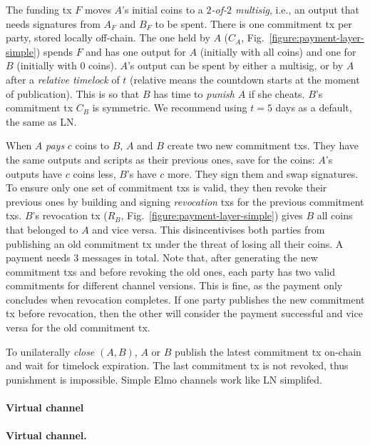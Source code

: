   The funding tx $F$ moves $A$'s initial coins to a \emph{$2$-of-$2$ multisig}, i.e., an
  output that needs signatures from $A_F$ and $B_F$ to be spent. There is one
  commitment tx per party, stored locally off-chain. The one held by $A$
  ($C_A$, Fig.~\ref{figure:payment-layer-simple}) spends $F$
  and has one output for $A$ (initially with all coins) and one for $B$
  (initially with $0$ coins). $A$'s output can be spent by either a multisig, or
  by $A$ after a \emph{relative timelock} of $t$ (relative means the countdown starts at the moment of
  publication). This is so
  that $B$ has time to \emph{punish} $A$ if she cheats. $B$'s commitment tx
  $C_B$ is symmetric. We recommend using $t = 5$ days as a default, the same as
  LN.

  When $A$ \emph{pays} $c$ coins to $B$, $A$ and $B$ create two new
  commitment txs.
  They have the same outputs and scripts as their previous ones, save for the
  coins: $A$'s outputs have $c$ coins less, $B$'s have $c$ more.
  They sign them and swap signatures. To ensure only one set of
  commitment txs is valid, they then revoke their previous ones by
  building and signing \emph{revocation} txs for the previous
  commitment txs. $B$'s revocation tx ($R_B$,
  Fig.~\ref{figure:payment-layer-simple}) gives $B$ all coins that belonged
  to $A$ and vice versa. This disincentivises both parties
  from publishing an old commitment tx under the threat of
  losing all their coins. A payment needs $3$ messages in total. Note
  that, after generating the new commitment txs and before revoking the old
  ones, each party has two valid commitments for different channel versions.
  This is fine, as the payment only concludes when revocation completes. If one
  party publishes the new commitment tx before revocation, then the
  other will consider the payment successful and vice versa for the old
  commitment tx.

  To unilaterally \emph{close} $(A, B)$, $A$ or $B$ publish the latest
  commitment tx on-chain and wait for timelock expiration. The last
  commitment tx is not revoked, thus punishment is impossible. Simple Elmo
  channels work like LN simplifed.

  \makeatletter%
    {\paragraph{Virtual channel}}%
    {\paragraph{Virtual channel.}}%
  \makeatother%

